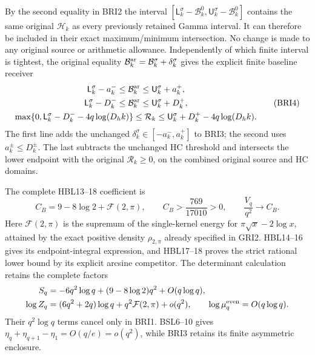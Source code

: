 \documentclass[11pt,a4paper]{article}
\begin{document}
By the second equality in BRI2 the interval
$[\mathsf L_k^\sigma-\mathcal B_k^0,
\mathsf U_k^\sigma-\mathcal B_k^0]$ contains the same original
$\mathcal H_k$ as every previously retained Gamma interval.
It can therefore be included in their exact maximum/minimum
intersection. No change is made to any original source or
arithmetic allowance. Independently of which finite interval is
tightest, the original equality
$\mathcal B_k^{\rm ar}=\mathcal B_k^\sigma+\delta_k^\sigma$
gives the explicit finite baseline receiver
\[
\begin{gathered}
 \mathsf L_k^\sigma-a_k^-\leq\mathcal B_k^{\rm ar}
                                   \leq\mathsf U_k^\sigma+a_k^+,\\
 \mathsf L_k^\sigma-D_k^-\leq\mathcal B_k^{\rm ar}
                                   \leq\mathsf U_k^\sigma+D_k^+,\\
 \max\{0,\mathsf L_k^\sigma-D_k^- -4q\log(D_hk)\}
 \leq\mathcal R_k
 \leq\mathsf U_k^\sigma+D_k^+ -4q\log(D_hk).
\end{gathered}\tag{BRI4}
\]
The first line adds the unchanged
$\delta_k^\sigma\in[-a_k^-,a_k^+]$ to BRI3; the second
uses $a_k^\pm\leq D_k^\pm$. The last subtracts the unchanged
HC threshold and intersects the lower endpoint with the original
$\mathcal R_k\geq0$, on the combined original source and HC domains.

The complete HBL13--18 coefficient is
\[
 C_B=9-8\log2+\mathcal F(2,\pi),\qquad
 C_B>\frac{769}{17010}>0,\qquad
 \frac{V_q}{q^2}\longrightarrow C_B.
 \tag{BRI5}
\]
Here $\mathcal F(2,\pi)$ is the supremum of the single-kernel
energy for $\pi\sqrt x-2\log x$, attained by the exact positive
density $\rho_{2,\pi}$ already specified in GRI2. HBL14--16
gives its endpoint-integral expression, and HBL17--18 proves
the strict rational lower bound by its explicit arcsine competitor.
The determinant calculation retains the complete factors
\[
\begin{split}
 S_q&=-6q^2\log q+(9-8\log2)q^2+O(q\log q),\\
 \log Z_q&=(6q^2+2q)\log q+q^2\mathcal F(2,\pi)+o(q^2),\qquad
 \log\mu_q^{\rm even}=O(q\log q).
\end{split}
\]
Their $q^2\log q$ terms cancel only in BRI1. BSL6--10 gives
$\eta_q+\eta_{q+1}-\eta_1=O(q/e)=o(q^2)$, while BRI3
retains its finite asymmetric enclosure.
\end{document}
